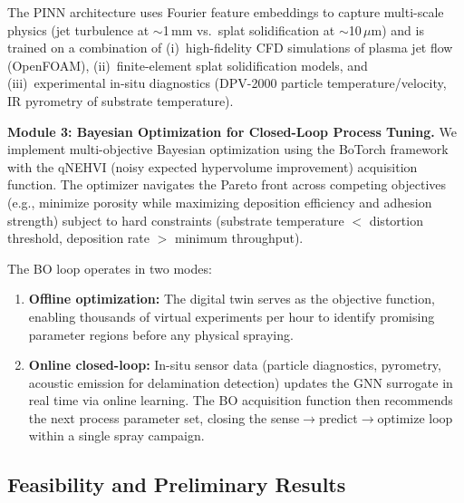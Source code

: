 \documentclass[11pt,letterpaper]{article}
\begin{document}
The PINN architecture uses Fourier feature embeddings to capture
multi-scale physics (jet turbulence at $\sim$1\,mm vs.\ splat
solidification at $\sim$10\,$\mu$m) and is trained on a combination of
(i)~high-fidelity CFD simulations of plasma jet flow (OpenFOAM),
(ii)~finite-element splat solidification models, and (iii)~experimental
in-situ diagnostics (DPV-2000 particle temperature/velocity, IR
pyrometry of substrate temperature).

\textbf{Module 3: Bayesian Optimization for Closed-Loop Process Tuning.}
We implement multi-objective Bayesian optimization using the BoTorch
framework with the qNEHVI (noisy expected hypervolume improvement)
acquisition function. The optimizer navigates the Pareto front across
competing objectives (e.g., minimize porosity while maximizing deposition
efficiency and adhesion strength) subject to hard constraints
(substrate temperature $<$ distortion threshold, deposition rate $>$
minimum throughput).

The BO loop operates in two modes:
\begin{enumerate}[nosep]
  \item \textbf{Offline optimization:} The digital twin serves as the
        objective function, enabling thousands of virtual experiments per
        hour to identify promising parameter regions before any physical
        spraying.
  \item \textbf{Online closed-loop:} In-situ sensor data (particle
        diagnostics, pyrometry, acoustic emission for delamination
        detection) updates the GNN surrogate in real time via online
        learning. The BO acquisition function then recommends the next
        process parameter set, closing the
        sense$\rightarrow$predict$\rightarrow$optimize loop within a
        single spray campaign.
\end{enumerate}

\subsection{Feasibility and Preliminary Results}
\end{document}
